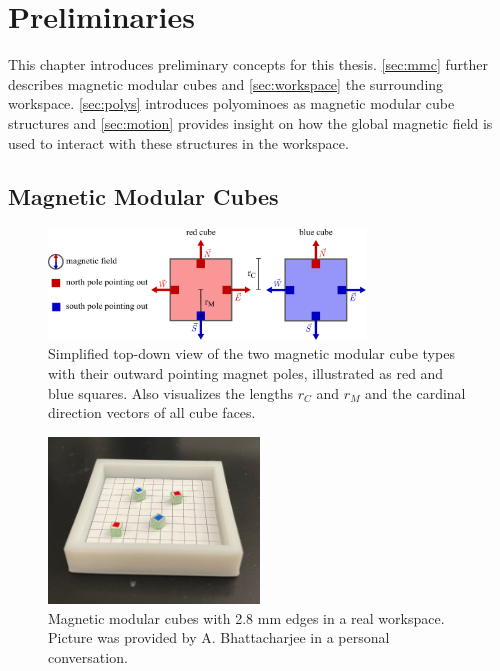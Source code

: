 \chapter{Preliminaries}
\label{chap:prelim}

This chapter introduces preliminary concepts for this thesis.
\autoref{sec:mmc} further describes magnetic modular cubes and \autoref{sec:workspace} the surrounding workspace.
\autoref{sec:polys} introduces polyominoes as magnetic modular cube structures and \autoref{sec:motion} provides insight on how the global magnetic field is used to interact with these structures in the workspace.

\section{Magnetic Modular Cubes}
\label{sec:mmc}

\begin{figure}
	\centering
	\includegraphics[width=0.75\textwidth]{figures/magnetic_cubes.pdf}
	\caption[Top-down view of magnetic modular cubes]{Simplified top-down view of the two magnetic modular cube types with their outward pointing magnet poles, illustrated as red and blue squares. Also visualizes the lengths $r_C$ and $r_M$ and the cardinal direction vectors of all cube faces.}
	\label{fig:magnetic_cubes}
\end{figure}

\begin{figure}
	\centering
	\includegraphics[width=0.5\textwidth]{figures/real_mmcs2.png}
	\caption[Picture of magnetic modular cubes in a real workspace]{Magnetic modular cubes with 2.8 mm edges in a real workspace. Picture was provided by A. Bhattacharjee in a personal conversation.}
	\label{fig:real_mmcs}
\end{figure}


